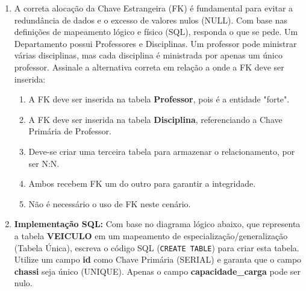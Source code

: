 \documentclass[12pt,a4paper]{article}
\begin{document}
\begin{enumerate}
\begin{enumerate}[label=\Alph*)]
    \item \textbf{DATA\_CENTER}(\underline{id\_ativo}: inteiro, ip: texto, conexao: booleano)
\end{enumerate}
    \item A correta alocação da Chave Estrangeira (FK) é fundamental para evitar a redundância de dados e o excesso de valores nulos (NULL). Com base nas definições de mapeamento lógico e físico (SQL), responda o que se pede. Um Departamento possui Professores e Disciplinas. Um professor pode ministrar várias disciplinas, mas cada disciplina é ministrada por apenas um único professor. Assinale a alternativa correta em relação a onde a FK deve ser inserida:
    \begin{enumerate}[label=\Alph*)]
        \item A FK deve ser inserida na tabela \textbf{Professor}, pois é a entidade "forte".
        \item A FK deve ser inserida na tabela \textbf{Disciplina}, referenciando a Chave Primária de Professor.
        \item Deve-se criar uma terceira tabela para armazenar o relacionamento, por ser N:N.
        \item Ambos recebem FK um do outro para garantir a integridade.
        \item Não é necessário o uso de FK neste cenário.
    \end{enumerate}

    \item \textbf{Implementação SQL:} Com base no diagrama lógico abaixo, que representa a tabela \textbf{VEICULO} em um mapeamento de especialização/generalização (Tabela Única), escreva o código SQL (\texttt{CREATE TABLE}) para criar esta tabela. Utilize um campo \textbf{id} como Chave Primária (SERIAL) e garanta que o campo \textbf{chassi} seja único (UNIQUE). Apenas o campo \textbf{capacidade\_carga} pode ser nulo.

    \begin{center}
\end{center}
\end{enumerate}
\end{document}
